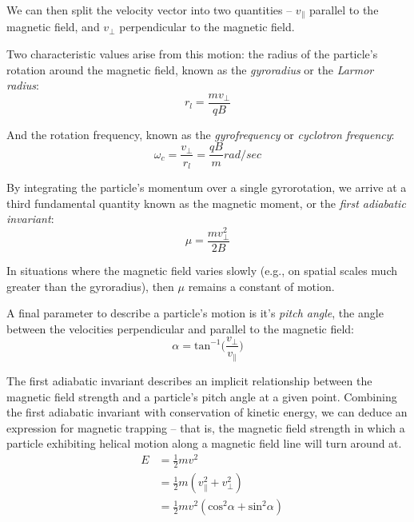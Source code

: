 We can then split the velocity vector into two quantities -- $v_\parallel$ parallel to the magnetic field, and $v_\perp$ perpendicular to the magnetic field.

Two characteristic values arise from this motion: the radius of the particle's rotation around the magnetic field, known as the \emph{gyroradius} or the \emph{Larmor radius}:
\begin{equation}
r_l = \frac{m v_\perp}{qB}
\end{equation}

And the rotation frequency, known as the \emph{gyrofrequency} or \emph{cyclotron frequency}:
\begin{equation}
\omega_c = \frac{v_\perp}{r_l} = \frac{q B}{m} \unit{rad/sec}
\end{equation}

By integrating the particle's momentum over a single gyrorotation, we arrive at a third fundamental quantity known as the magnetic moment, or the \emph{first adiabatic invariant}:
\begin{equation}
\mu = \frac{m v_\perp^2}{2B}
\label{eqn:mu}
\end{equation}

In situations where the magnetic field varies slowly (e.g., on spatial scales much greater than the gyroradius), then $\mu$ remains a constant of motion.

A final parameter to describe a particle's motion is it's \emph{pitch angle}, the angle between the velocities perpendicular and parallel to the magnetic field:
\begin{equation}
\alpha = \mathrm{tan}^{-1}\bigg(\frac{v_\perp}{v_\parallel}\bigg)
\end{equation}

The first adiabatic invariant describes an implicit relationship between the magnetic field strength and a particle's pitch angle at a given point. 
Combining the first adiabatic invariant with conservation of kinetic energy, we can deduce an expression for magnetic trapping -- that is, the magnetic field strength in which a particle exhibiting helical motion along a magnetic field line will turn around at. 
\begin{eqnarray}
& E &= \frac{1}{2}mv^2 \\
& &= \frac{1}{2}m(v_\parallel^2 + v_\perp^2) \\
 & &= \frac{1}{2}mv^2(\mathrm{cos}^2\alpha + \mathrm{sin}^2\alpha)
\end{eqnarray}

